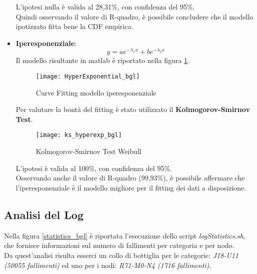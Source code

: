 \begin{itemize}
  L'ipotesi nulla è valida al 28,31\%, con confidenza del 95\%.\\
  Quindi osservando il valore di R-quadro, è possibile concludere che il
  modello ipotizzato fitta bene la CDF empirica.\\

  \clearpage

  \item \textbf{Iperesponenziale}:
  $$ y = a e^{- \lambda_1  x} +  b  e^{- \lambda_2  x} $$
  Il modello risultante in matlab è riportato nella figura \ref{HyperExponential_bgl}.\\

  \begin{figure}[!htbp]
    \centering
    \texttt{[image: HyperExponential\_bgl]}
    \caption{Curve Fitting modello iperesponenziale}
    \label{HyperExponential_bgl}
  \end{figure}

  Per valutare la bontà del fitting è stato utilizzato il \textbf{Kolmogorov-Smirnov Test}.\\

  \begin{figure}[!htbp]
    \centering
    \texttt{[image: ks\_hyperexp\_bgl]}
    \caption{Kolmogorov-Smirnov Test Weibull}
    \label{ks_hyperexp_bgl}
  \end{figure}

  L'ipotesi è valida al 100\%, con confidenza del 95\%.\\
  Osservando anche il valore di R-quadro (99,93\%), è possibile affermare che
  l'iperesponenziale è il modello migliore per il fitting dei dati a disposizione.\\

  \clearpage
\end{itemize}

\clearpage

\subsection{Analisi del Log}
Nella figura \ref{statistics_bgl} è riportata l'esecuzione dello script
\textit{logStatistics.sh}, che fornisce informazioni sul numero di fallimenti
per categoria e per nodo.\\
Da quest'analisi risulta esserci un collo di bottiglia per le categorie:
\textit{J18-U11 (50055 fallimenti)} ed uno per i nodi: \textit{R71-M0-N4 (1716 fallimenti)}.\\

